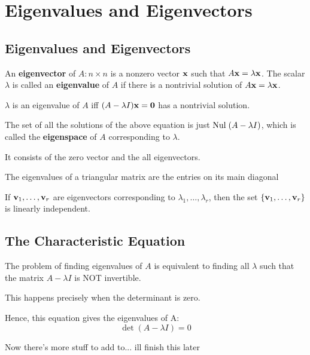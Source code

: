 \documentclass{report}
\begin{document}
\chapter{Eigenvalues and Eigenvectors}
\setcounter{theorem}{0}
\setcounter{definition}{0}

\section{Eigenvalues and Eigenvectors}

\begin{definition}
    An \textbf{eigenvector} of $A: n \times n$ is a nonzero vector $\mathbf{x}$ 
    such that $A \mathbf{x} = \lambda \mathbf{x}$. The scalar $\lambda$ is called an 
    \textbf{eigenvalue} of $A$ if there is a nontrivial solution of $A \mathbf{x} = \lambda \mathbf{x}$.
\end{definition}

$\lambda$ is an eigenvalue of $A$ iff $(A - \lambda I) \mathbf{x} = \mathbf{0}$ has a nontrivial solution.

The set of all the solutions of the above equation is just $\mathrm{Nul}\; (A - \lambda I)$, which is called the
\textbf{eigenspace} of $A$ corresponding to $\lambda$. 

It consists of the zero vector and the all eigenvectors.

\begin{theorem}
    The eigenvalues of a triangular matrix are the entries on its main diagonal
\end{theorem}

\begin{theorem}
    If $\mathbf{v}_1, \ldots, \mathbf{v}_r$ are eigenvectors corresponding to $\lambda_1, \ldots, \lambda_r$, 
    then the set $\{\mathbf{v}_1, \ldots, \mathbf{v}_r\}$ is linearly independent.
\end{theorem}

\section{The Characteristic Equation}

The problem of finding eigenvalues of $A$ is equivalent to finding all $\lambda$
such that the matrix $A - \lambda I$ is NOT invertible.

This happens precisely when the determinant is zero.

Hence, this equation gives the eigenvalues of A: \[\det (A - \lambda I) = 0\]

Now there's more stuff to add to... ill finish this later
\end{document}
